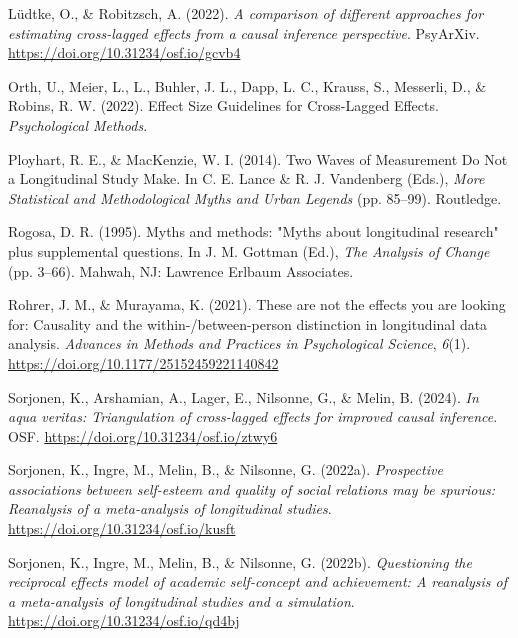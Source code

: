 \documentclass[
  man,floatsintext]{apa6}
\newlength{\cslhangindent}
\newenvironment{CSLReferences}[2] %
 {\begin{list}{}{%
  \setlength{\itemindent}{0pt}
  \setlength{\leftmargin}{0pt}
  \setlength{\parsep}{0pt}
  \ifodd #1
   \setlength{\leftmargin}{\cslhangindent}
   \setlength{\itemindent}{-1\cslhangindent}
  \fi
  \setlength{\itemsep}{#2\baselineskip}}}
 {\end{list}}
\begin{document}
\begin{CSLReferences}{1}{0}
Lüdtke, O., \& Robitzsch, A. (2022). \emph{A comparison of different approaches for estimating cross-lagged effects from a causal inference perspective}. PsyArXiv. \url{https://doi.org/10.31234/osf.io/gcvb4}

Orth, U., Meier, L., L., Buhler, J. L., Dapp, L. C., Krauss, S., Messerli, D., \& Robins, R. W. (2022). Effect {Size Guidelines} for {Cross-Lagged Effects}. \emph{Psychological Methods}.

Ployhart, R. E., \& MacKenzie, W. I. (2014). Two {Waves} of {Measurement Do Not} a {Longitudinal Study Make}. In C. E. Lance \& R. J. Vandenberg (Eds.), \emph{More {Statistical} and {Methodological Myths} and {Urban Legends}} (pp. 85--99). Routledge.

Rogosa, D. R. (1995). Myths and methods: "{Myths} about longitudinal research" plus supplemental questions. In J. M. Gottman (Ed.), \emph{The {Analysis} of {Change}} (pp. 3--66). Mahwah, NJ: Lawrence Erlbaum Associates.

Rohrer, J. M., \& Murayama, K. (2021). These are not the effects you are looking for: {Causality} and the within-/between-person distinction in longitudinal data analysis. \emph{Advances in Methods and Practices in Psychological Science}, \emph{6}(1). \url{https://doi.org/10.1177/25152459221140842}

Sorjonen, K., Arshamian, A., Lager, E., Nilsonne, G., \& Melin, B. (2024). \emph{In aqua veritas: {Triangulation} of cross-lagged effects for improved causal inference}. OSF. \url{https://doi.org/10.31234/osf.io/ztwy6}

Sorjonen, K., Ingre, M., Melin, B., \& Nilsonne, G. (2022a). \emph{Prospective associations between self-esteem and quality of social relations may be spurious: {Reanalysis} of a meta-analysis of longitudinal studies}. \url{https://doi.org/10.31234/osf.io/kusft}

Sorjonen, K., Ingre, M., Melin, B., \& Nilsonne, G. (2022b). \emph{Questioning the reciprocal effects model of academic self-concept and achievement: {A} reanalysis of a meta-analysis of longitudinal studies and a simulation}. \url{https://doi.org/10.31234/osf.io/qd4bj}


\end{CSLReferences}
\end{document}
